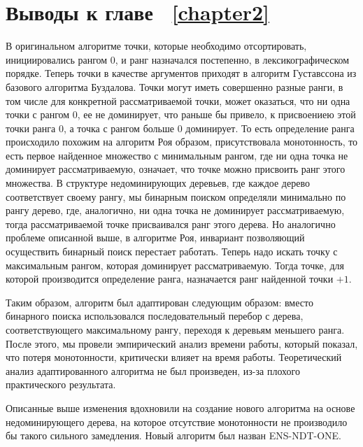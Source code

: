 \section{Выводы к главе ~\ref{chapter2}}

В оригинальном алгоритме точки, которые необходимо отсортировать, инициировались рангом $0$, и ранг назначался постепенно, в лексикографическом порядке. Теперь точки в качестве аргументов приходят в алгоритм Густавссона из базового алгоритма Буздалова. Точки могут иметь совершенно разные ранги, в том числе для конкретной рассматриваемой точки, может оказаться, что ни одна точки с рангом $0$, ее не доминирует, что раньше бы привело, к присвоениею этой точки ранга $0$, а точка с рангом больше $0$ доминирует. То есть определение ранга происходило похожим на алгоритм Роя образом, присутствовала монотонность, то есть первое найденное множество с минимальным рангом, где ни одна точка не доминирует рассматриваемую, означает, что точке можно присвоить ранг этого множества. В структуре недоминирующих деревьев, где каждое дерево соответствует своему рангу, мы бинарным поиском определяли минимально по рангу дерево, где, аналогично, ни одна точка не доминирует рассматриваемую, тогда рассматриваемой точке присваивался ранг этого дерева. Но аналогично проблеме описанной выше, в алгоритме Роя, инвариант позволяющий осуществить бинарный поиск перестает работать. Теперь надо искать точку с максимальным рангом, которая доминирует рассматриваемую. Тогда точке, для которой производится определение ранга, назначается ранг найденной точки $+ 1$.  

Таким образом, алгоритм был адаптирован следующим образом: вместо бинарного поиска использовался последовательный перебор с дерева, соответствующего максимальному рангу, переходя к деревьям меньшего ранга. После этого, мы провели эмпирический анализ времени работы, который показал, что потеря монотонности, критически влияет на время работы. Теоретический анализ адаптированного алгоритма не был произведен, из-за плохого практического результата.

Описанные выше изменения вдохновили на создание нового алгоритма на основе недоминирующего дерева, на которое отсутствие монотонности не производило бы такого сильного замедления. Новый алгоритм был назван ENS-NDT-ONE.


